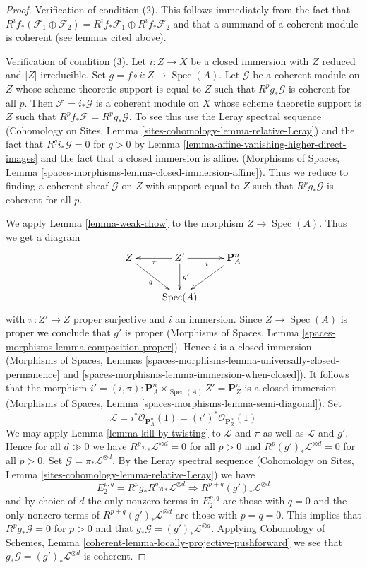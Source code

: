 \documentclass[10pt,a4paper]{amsart}
\theoremstyle{plain}
\theoremstyle{definition}
\theoremstyle{remark}
\numberwithin{equation}{subsection}
\def\Spec{\mathop{\mathrm{Spec}}}
\begin{document}
\begin{proof}
\medskip\noindent
Verification of condition (2). This follows immediately from the fact
that $R^if_*(\mathcal{F}_1 \oplus \mathcal{F}_2) =
R^if_*\mathcal{F}_1 \oplus R^if_*\mathcal{F}_2$ and that a summand
of a coherent module is coherent (see lemmas cited above).

\medskip\noindent
Verification of condition (3). Let $i : Z \to X$ be a closed immersion
with $Z$ reduced and $|Z|$ irreducible. Set $g = f \circ i : Z \to \Spec(A)$.
Let $\mathcal{G}$ be a coherent module on $Z$ whose scheme theoretic support
is equal to $Z$ such that $R^pg_*\mathcal{G}$ is coherent for all $p$.
Then $\mathcal{F} = i_*\mathcal{G}$ is a coherent module on
$X$ whose scheme theoretic support is $Z$ such that
$R^pf_*\mathcal{F} = R^pg_*\mathcal{G}$. To see this use
the Leray spectral sequence
(Cohomology on Sites, Lemma \ref{sites-cohomology-lemma-relative-Leray})
and the fact that $R^qi_*\mathcal{G} = 0$ for $q > 0$ by
Lemma \ref{lemma-affine-vanishing-higher-direct-images}
and the fact that a closed immersion is affine.
(Morphisms of Spaces, Lemma
\ref{spaces-morphisms-lemma-closed-immersion-affine}).
Thus we reduce to finding a coherent sheaf $\mathcal{G}$ on $Z$
with support equal to $Z$ such that $R^pg_*\mathcal{G}$ is coherent
for all $p$.

\medskip\noindent
We apply Lemma \ref{lemma-weak-chow} to the morphism $Z \to \Spec(A)$.
Thus we get a diagram
$$
\xymatrix{
Z \ar[rd]_g & Z' \ar[d]^-{g'} \ar[l]^\pi \ar[r]_i & \mathbf{P}^n_A \ar[dl] \\
& \Spec(A) &
}
$$
with $\pi : Z' \to Z$ proper surjective and $i$ an immersion.
Since $Z \to \Spec(A)$ is proper we conclude that $g'$ is proper
(Morphisms of Spaces, Lemma \ref{spaces-morphisms-lemma-composition-proper}).
Hence $i$ is a closed immersion
(Morphisms of Spaces, Lemmas
\ref{spaces-morphisms-lemma-universally-closed-permanence} and
\ref{spaces-morphisms-lemma-immersion-when-closed}).
It follows that the morphism
$i' = (i, \pi) : \mathbf{P}^n_A \times_{\Spec(A)} Z' = \mathbf{P}^n_Z$ is
a closed immersion
(Morphisms of Spaces, Lemma \ref{spaces-morphisms-lemma-semi-diagonal}).
Set
$$
\mathcal{L} =
i^*\mathcal{O}_{\mathbf{P}^n_A}(1) =
(i')^*\mathcal{O}_{\mathbf{P}^n_Z}(1)
$$
We may apply Lemma \ref{lemma-kill-by-twisting}
to $\mathcal{L}$ and $\pi$ as well as $\mathcal{L}$ and $g'$.
Hence for all $d \gg 0$ we have
$R^p\pi_*\mathcal{L}^{\otimes d} = 0$ for all $p > 0$ and
$R^p(g')_*\mathcal{L}^{\otimes d} = 0$ for all $p > 0$.
Set $\mathcal{G} = \pi_*\mathcal{L}^{\otimes d}$.
By the Leray spectral sequence
(Cohomology on Sites, Lemma \ref{sites-cohomology-lemma-relative-Leray})
we have
$$
E_2^{p, q} = R^pg_* R^q\pi_*\mathcal{L}^{\otimes d}
\Rightarrow
R^{p + q}(g')_*\mathcal{L}^{\otimes d}
$$
and by choice of $d$ the only nonzero terms in $E_2^{p, q}$ are
those with $q = 0$ and the only nonzero terms of
$R^{p + q}(g')_*\mathcal{L}^{\otimes d}$ are those with $p = q = 0$.
This implies that $R^pg_*\mathcal{G} = 0$ for $p > 0$ and
that $g_*\mathcal{G} = (g')_*\mathcal{L}^{\otimes d}$.
Applying
Cohomology of Schemes, Lemma
\ref{coherent-lemma-locally-projective-pushforward}
we see that $g_*\mathcal{G} = (g')_*\mathcal{L}^{\otimes d}$ is
coherent.


\end{proof}
\end{document}
